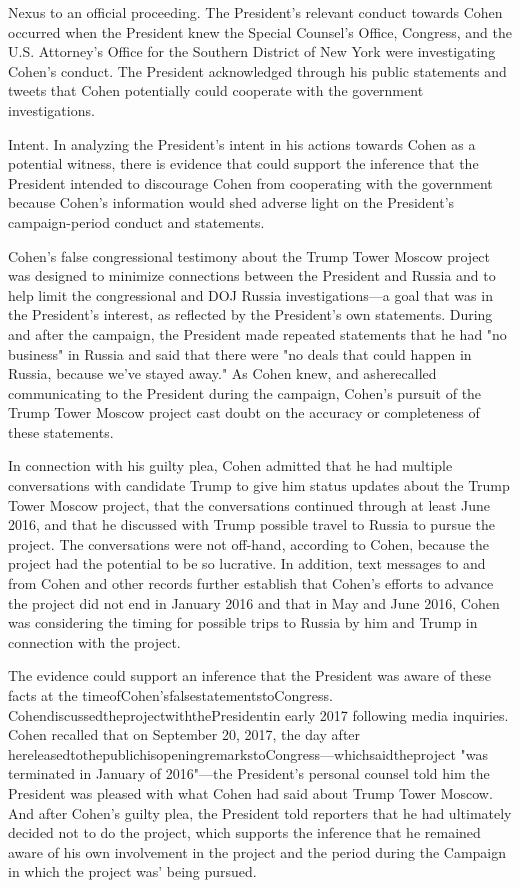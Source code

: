 {Nexus to an official proceeding.
The President's relevant conduct towards Cohen occurred when the President knew the Special Counsel's Office, Congress, and the U.S. Attorney's Office for the Southern District of New York were investigating Cohen's conduct.
The President acknowledged through his public statements and tweets that Cohen potentially could cooperate with the government investigations.

Intent.
In analyzing the President's intent in his actions towards Cohen as a potential witness, there is evidence that could support the inference that the President intended to discourage Cohen from cooperating with the government because Cohen's information would shed adverse light on the President's campaign-period conduct and statements.

Cohen's false congressional testimony about the Trump Tower Moscow project was designed to minimize connections between the President and Russia and to help limit the congressional and DOJ Russia investigations—a goal that was in the President's interest, as reflected by the President's own statements.
During and after the campaign, the President made repeated statements that he had "no business" in Russia and said that there were "no deals that could happen in Russia, because we've stayed away."
As Cohen knew, and asherecalled communicating to the President during the campaign, Cohen's pursuit of the Trump Tower Moscow project cast doubt on the accuracy or completeness of these statements.

In connection with his guilty plea, Cohen admitted that he had multiple conversations with candidate Trump to give him status updates about the Trump Tower Moscow project, that the conversations continued through at least June 2016, and that he discussed with Trump possible travel to Russia to pursue the project.
The conversations were not off-hand, according to Cohen, because the project had the potential to be so lucrative.
In addition, text messages to and from Cohen and other records further establish that Cohen's efforts to advance the project did not end in January 2016 and that in May and June 2016, Cohen was considering the timing for possible trips to Russia by him and Trump in connection with the project.

The evidence could support an inference that the President was aware of these facts at the timeofCohen'sfalsestatementstoCongress.
CohendiscussedtheprojectwiththePresidentin early 2017 following media inquiries.
Cohen recalled that on September 20, 2017, the day after hereleasedtothepublichisopeningremarkstoCongress—whichsaidtheproject "was terminated in January of 2016"—the President's personal counsel told him the President was pleased with what Cohen had said about Trump Tower Moscow.
And after Cohen's guilty plea, the President told reporters that he had ultimately decided not to do the project, which supports the inference that he remained aware of his own involvement in the project and the period during the Campaign in which the project was' being pursued.

}
